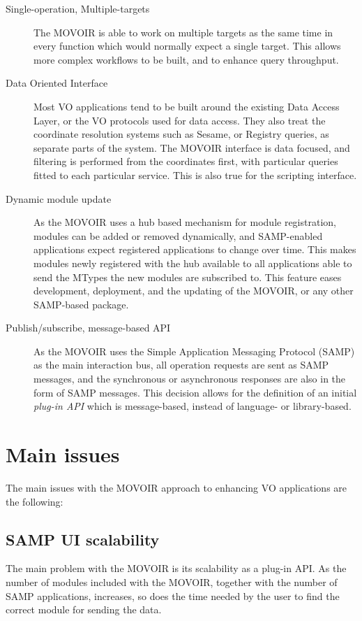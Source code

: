 \begin{description}
			\item[Single-operation, Multiple-targets] The MOVOIR is
			able to work on multiple targets as the same time in
			every function which would normally expect a single
			target. This allows more complex workflows to be built,
			and to enhance query throughput.
			
			 \item[Data Oriented Interface] Most VO applications
			tend to be built around the existing Data Access Layer,
			or the VO protocols used for data access. They also
			treat the coordinate resolution systems such as Sesame,
			or Registry queries, as separate parts of the system.
			The MOVOIR interface is data focused, and filtering is
			performed from the coordinates first, with particular
			queries fitted to each particular service. This is also
			true for the scripting interface.
			
			\item[Dynamic module update] As the MOVOIR uses a hub
			based mechanism for module registration, modules can be
			added or removed dynamically, and SAMP-enabled
			applications expect registered applications to change
			over time. This makes modules newly registered with the
			hub available to all applications able to send the
			MTypes the new modules are subscribed to. This feature
			eases development, deployment, and the updating of
			the MOVOIR, or any other SAMP-based package.
			
			 \item[Publish/subscribe, message-based API]
			As the MOVOIR uses the
			Simple
			Application Messaging Protocol (SAMP) as the main
			interaction bus, all operation requests are sent as
			SAMP messages, and the synchronous or asynchronous
			responses are also in the form of SAMP messages. This
			decision allows for the definition of an initial
			\emph{plug-in API} which is message-based, instead of
			language- or library-based.
		\end{description}
		
	
	
	\section{Main issues} %
	\label{sec:movoir_main_issues}
		
		The main issues with the MOVOIR approach to enhancing VO
		applications are the following:
		
		\subsection{SAMP UI scalability} %
		\label{sub:samp_ui_scalability}
			The main problem with the MOVOIR is its scalability as
			a plug-in API. As the number of modules included with
			the MOVOIR, together with the number of SAMP
			applications, increases, so does the time needed by the
			user to find the correct module for sending the data.
			
